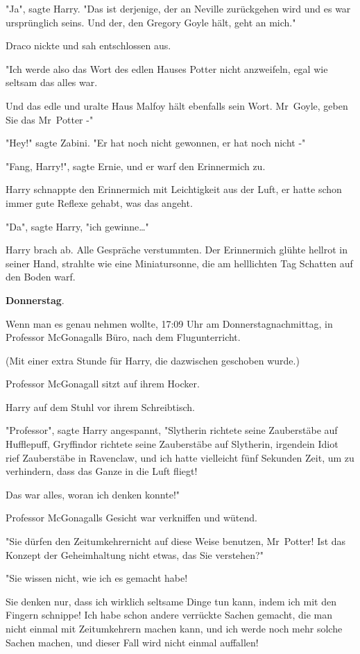 {"Ja", sagte Harry. "Das ist derjenige, der an Neville zurückgehen wird und es war ursprünglich seins. Und der, den Gregory Goyle hält, geht an mich."

Draco nickte und sah entschlossen aus.

"Ich werde also das Wort des edlen Hauses Potter nicht anzweifeln, egal wie seltsam das alles war.

Und das edle und uralte Haus Malfoy hält ebenfalls sein Wort. Mr~Goyle, geben Sie das Mr~Potter -"

"Hey!" sagte Zabini. "Er hat noch nicht gewonnen, er hat noch nicht -"

"Fang, Harry!", sagte Ernie, und er warf den Erinnermich zu.

Harry schnappte den Erinnermich mit Leichtigkeit aus der Luft, er hatte schon immer gute Reflexe gehabt, was das angeht.

"Da", sagte Harry, "ich gewinne…"

Harry brach ab. Alle Gespräche verstummten. Der Erinnermich glühte hellrot in seiner Hand, strahlte wie eine Miniatursonne, die am helllichten Tag Schatten auf den Boden warf.

\textbf{Donnerstag}.

Wenn man es genau nehmen wollte, 17:09 Uhr am Donnerstagnachmittag, in Professor McGonagalls Büro, nach dem Flugunterricht.

(Mit einer extra Stunde für Harry, die dazwischen geschoben wurde.)

Professor McGonagall sitzt auf ihrem Hocker.

Harry auf dem Stuhl vor ihrem Schreibtisch.

"Professor", sagte Harry angespannt, "Slytherin richtete seine Zauberstäbe auf Hufflepuff, Gryffindor richtete seine Zauberstäbe auf Slytherin, irgendein Idiot rief Zauberstäbe in Ravenclaw, und ich hatte vielleicht fünf Sekunden Zeit, um zu verhindern, dass das Ganze in die Luft fliegt!

Das war alles, woran ich denken konnte!"

Professor McGonagalls Gesicht war verkniffen und wütend.

"Sie dürfen den Zeitumkehrernicht auf diese Weise benutzen, Mr~Potter! Ist das Konzept der Geheimhaltung nicht etwas, das Sie verstehen?"

"Sie wissen nicht, wie ich es gemacht habe!

Sie denken nur, dass ich wirklich seltsame Dinge tun kann, indem ich mit den Fingern schnippe! Ich habe schon andere verrückte Sachen gemacht, die man nicht einmal mit Zeitumkehrern machen kann, und ich werde noch mehr solche Sachen machen, und dieser Fall wird nicht einmal auffallen!

}
